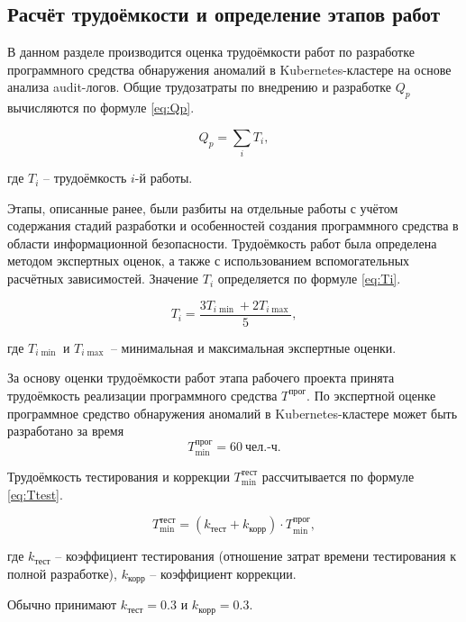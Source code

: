 \subsection{Расчёт трудоёмкости и определение этапов работ}

В данном разделе производится оценка трудоёмкости работ по разработке программного средства обнаружения аномалий в Kubernetes-кластере на основе анализа audit-логов. Общие трудозатраты по внедрению и разработке $Q_p$ вычисляются по формуле \eqref{eq:Qp}.

\begin{equation}\label{eq:Qp}
Q_p = \sum_i T_i,
\end{equation}

где $T_i$ -- трудоёмкость $i$-й работы.

Этапы, описанные ранее, были разбиты на отдельные работы с учётом содержания стадий разработки и особенностей создания программного средства в области информационной безопасности. Трудоёмкость работ была определена методом экспертных оценок, а также с использованием вспомогательных расчётных зависимостей. Значение $T_i$ определяется по формуле \eqref{eq:Ti}.

\begin{equation}\label{eq:Ti}
T_i = \frac{3T_{i\min} + 2T_{i\max}}{5},
\end{equation}

где $T_{i\min}$ и $T_{i\max}$ -- минимальная и максимальная экспертные оценки.

За основу оценки трудоёмкости работ этапа рабочего проекта принята трудоёмкость реализации программного средства $T^{\text{прог}}$. По экспертной оценке программное средство обнаружения аномалий в Kubernetes-кластере может быть разработано за время
$$
T_{\min}^{\text{прог}} = 60 \ \text{чел.-ч}.
$$

Трудоёмкость тестирования и коррекции $T_{\min}^{\text{тест}}$ рассчитывается по формуле \eqref{eq:Ttest}.

\begin{equation}
T_{\min}^{\text{тест}} = (k_{\text{тест}} + k_{\text{корр}})\cdot T_{\min}^{\text{прог}},
\label{eq:Ttest}
\end{equation}

где $k_{\text{тест}}$ -- коэффициент тестирования (отношение затрат времени тестирования к полной разработке), $k_{\text{корр}}$ -- коэффициент коррекции.

Обычно принимают $k_{\text{тест}} = 0.3$ и $k_{\text{корр}} = 0.3$.

